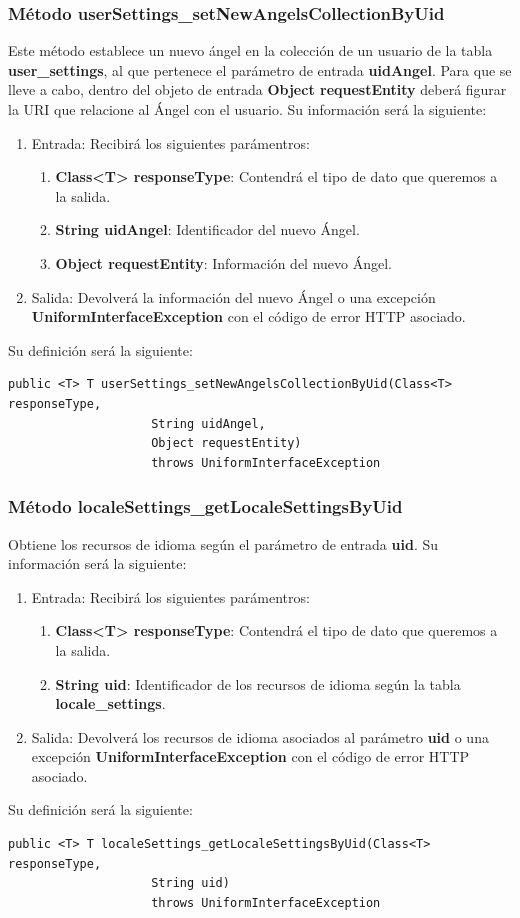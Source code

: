 \subsubsection{Método userSettings\_setNewAngelsCollectionByUid}
Este método establece un nuevo ángel en la colección de un usuario de la tabla \textbf{user\_settings}, al que pertenece el parámetro de entrada \textbf{uidAngel}. Para que se lleve a cabo, dentro del objeto de entrada \textbf{Object requestEntity} deberá figurar la URI que relacione al Ángel con el usuario. Su información será la siguiente:
\begin{enumerate}
\item Entrada: Recibirá los siguientes parámentros:
\begin{enumerate}
\item \textbf{Class<T> responseType}: Contendrá el tipo de dato que queremos a la salida. 
\item \textbf{String uidAngel}: Identificador del nuevo Ángel.
\item \textbf{Object requestEntity}: Información del nuevo Ángel.
\end{enumerate}
\item Salida: Devolverá la información del nuevo Ángel o una excepción \textbf{UniformInterfaceException} con el código de error HTTP asociado.
\end{enumerate}
\bigskip
\par
Su definición será la siguiente:
\begin{verbatim}public <T> T userSettings_setNewAngelsCollectionByUid(Class<T> responseType, 
					String uidAngel, 
					Object requestEntity) 
					throws UniformInterfaceException \end{verbatim}

\subsubsection{Método localeSettings\_getLocaleSettingsByUid}
Obtiene los recursos de idioma según el parámetro de entrada \textbf{uid}. Su información será la siguiente:
\begin{enumerate}
\item Entrada: Recibirá los siguientes parámentros:
\begin{enumerate}
\item \textbf{Class<T> responseType}: Contendrá el tipo de dato que queremos a la salida. 
\item \textbf{String uid}: Identificador de los recursos de idioma según la tabla \textbf{locale\_settings}.
\end{enumerate}
\item Salida: Devolverá los recursos de idioma asociados al parámetro \textbf{uid} o una excepción \textbf{UniformInterfaceException} con el código de error HTTP asociado.
\end{enumerate}
\bigskip
\par
Su definición será la siguiente:
\begin{verbatim}public <T> T localeSettings_getLocaleSettingsByUid(Class<T> responseType,
					String uid) 
					throws UniformInterfaceException\end{verbatim}

